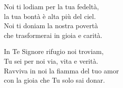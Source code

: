 

\spazio

\strofa Noi ti lodiam per la tua fedeltà,\\
la tua bontà è alta più del ciel.\\
Noi ti doniam la nostra povertà\\
che trasformerai in gioia e carità.

\spazio


\spazio

\strofa In Te Signore rifugio noi troviam,\\
Tu sei per noi via, vita e verità.\\
Ravviva in noi la fiamma del tuo amor\\
con la gioia che Tu solo sai donar.

\spazio


